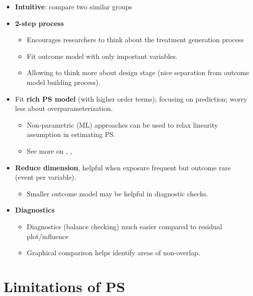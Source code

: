 \documentclass[
]{book}
\providecommand{\tightlist}{%
  \setlength{\itemsep}{0pt}\setlength{\parskip}{0pt}}
\begin{document}
\begin{itemize}
\item
  \textbf{Intuitive}: compare two similar groups
\item
  \textbf{2-step process}

  \begin{itemize}
  \tightlist
  \item
    Encourages researchers to think about the treatment generation process
  \item
    Fit outcome model with only important variables.
  \item
    Allowing to think more about design stage (nice separation from outcome model building process).
  \end{itemize}
\item
  Fit \textbf{rich PS model} (with higher order terms); focusing on prediction; worry less about overparameterization.

  \begin{itemize}
  \tightlist
  \item
    Non-parametric (ML) approaches can be used to relax linearity assumption in estimating PS.
  \item
    See more on \citet{lee2010improving}, \citet{pirracchio2015improving}, \citet{alam2019should}
  \end{itemize}
\item
  \textbf{Reduce dimension}, helpful when exposure frequent but outcome rare (event per variable).

  \begin{itemize}
  \tightlist
  \item
    Smaller outcome model may be helpful in diagnostic checks.
  \end{itemize}
\item
  \textbf{Diagnostics}

  \begin{itemize}
  \tightlist
  \item
    Diagnostics (balance checking) much easier compared to residual plot/influence
  \item
    Graphical comparison helps identify areas of non-overlap.
  \end{itemize}
\end{itemize}

\hypertarget{limitations-of-ps}{%
\section{Limitations of PS}\label{limitations-of-ps}}
\end{document}
